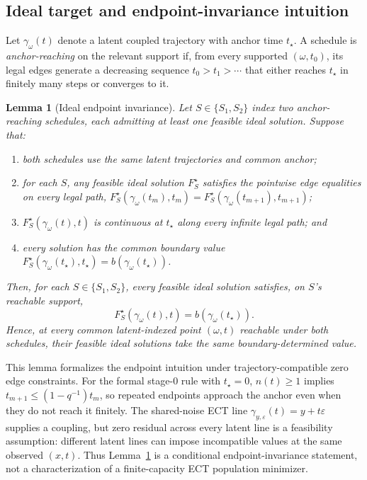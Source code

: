 \documentclass{article}
\newif\ifshowcomments
\newcommand{\claimnote}[1]{%
  \ifshowcomments{\color{claimpurple}\textbf{[CLAIM CEILING: #1]}}\fi}
\newtheorem{lemma}{Lemma}
\begin{document}
\claimnote{Describe $g$ as a controlled implementation probe of pair spacing.
In this protocol it is exactly a stage-0 $q_{\mathrm{eff}}$
reparameterization at pair construction.}

\subsection{Ideal target and endpoint-invariance intuition}
\label{sec:theory-ideal-endpoint}

Let $\gamma_\omega(t)$ denote a latent coupled trajectory with anchor time
$t_\star$. A schedule is \emph{anchor-reaching} on the relevant support if,
from every supported $(\omega,t_0)$, its legal edges generate a decreasing
sequence $t_0>t_1>\cdots$ that either reaches $t_\star$ in finitely many steps
or converges to it.

\begin{lemma}[Ideal endpoint invariance]
\label{lem:ideal-endpoint-invariance}
Let $S\in\{S_1,S_2\}$ index two anchor-reaching schedules, each admitting at
least one feasible ideal solution. Suppose that:
\begin{enumerate}
  \item both schedules use the same latent trajectories and common anchor;
  \item for each $S$, any feasible ideal solution $F_S^\star$ satisfies the
  pointwise edge equalities on every legal path,
  $F_S^\star(\gamma_\omega(t_m),t_m)
   =F_S^\star(\gamma_\omega(t_{m+1}),t_{m+1})$;
  \item $F_S^\star(\gamma_\omega(t),t)$ is continuous at $t_\star$ along every
  infinite legal path; and
  \item every solution has the common boundary value
  $F_S^\star(\gamma_\omega(t_\star),t_\star)
   =b(\gamma_\omega(t_\star))$.
\end{enumerate}
Then, for each $S\in\{S_1,S_2\}$, every feasible ideal solution satisfies,
on $S$'s reachable support,
\begin{equation}
  F_S^\star(\gamma_\omega(t),t)
  =b(\gamma_\omega(t_\star)).
  \label{eq:ideal-endpoint-invariance}
\end{equation}
Hence, at every common latent-indexed point $(\omega,t)$ reachable under both
schedules, their feasible ideal solutions take the same boundary-determined
value.
\end{lemma}

This lemma formalizes the endpoint intuition under trajectory-compatible zero
edge constraints. For the formal stage-0 rule with $t_\star=0$,
$n(t)\geq1$ implies $t_{m+1}\leq(1-q^{-1})t_m$, so repeated endpoints approach
the anchor even when they do not reach it finitely. The shared-noise ECT line
$\gamma_{y,\varepsilon}(t)=y+t\varepsilon$ supplies a coupling, but zero
residual across every latent line is a feasibility assumption: different
latent lines can impose incompatible values at the same observed $(x,t)$.
Thus Lemma~\ref{lem:ideal-endpoint-invariance} is a conditional endpoint-invariance
statement, not a characterization of a finite-capacity ECT population
minimizer.
\end{document}
